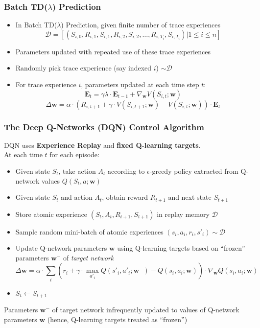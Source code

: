 \documentclass{beamer}
\begin{document}
\begin{frame}
\frametitle{Batch TD($\lambda$) Prediction}
\pause
\begin{itemize}[<+->]
\item In Batch TD($\lambda$) Prediction, given finite number of trace experiences
$$\mathcal{D} = [(S_{i,0}, R_{i,1}, S_{i,1}, R_{i,2}, S_{i,2}, \ldots, R_{i,T_i}, S_{i,T_i}) | 1 \leq i \leq n]$$
\item Parameters updated with repeated use of these trace experiences
\item Randomly pick trace experience (say indexed $i$) $\sim \mathcal{D}$
\item For trace experience $i$, parameters updated at each time step $t$:
$$\bm{E}_t = \gamma \lambda \cdot \bm{E}_{t-1} + \nabla_{\bm{w}} V(S_{i,t};\bm{w})$$
$$\Delta \bm{w} = \alpha \cdot (R_{i,t+1} + \gamma \cdot V(S_{i,t+1}; \bm{w}) - V(S_{i,t}; \bm{w})) \cdot \bm{E}_t$$
\end{itemize}
\end{frame}

\begin{frame}
\frametitle{The Deep Q-Networks (DQN) Control Algorithm}
\pause
DQN uses {\bf Experience Replay} and {\bf fixed Q-learning targets}.\\
\pause
At each time $t$ for each episode:
\begin{itemize}[<+->]
\item Given state $S_t$, take action $A_t$ according to $\epsilon$-greedy policy extracted from Q-network values $Q(S_t,a;\bm{w})$
\item Given state $S_t$ and action $A_t$, obtain reward $R_{t+1}$ and next state $S_{t+1}$
\item Store atomic experience $(S_t, A_t, R_{t+1}, S_{t+1})$ in replay memory $\mathcal{D}$
\item Sample random mini-batch  of atomic experiences $(s_i,a_i,r_i,s'_i) \sim \mathcal{D}$
\item Update Q-network parameters $\bm{w}$ using Q-learning targets based on ``frozen'' parameters $\bm{w}^-$ of {\em target network}
$$\Delta \bm{w} = \alpha \cdot \sum_i (r_i + \gamma \cdot \max_{a'_i} Q(s'_i, a'_i; \bm{w}^-) - Q(s_i,a_i;\bm{w})) \cdot \nabla_{\bm{w}} Q(s_i,a_i;\bm{w})$$ 
\item $S_t \leftarrow S_{t+1}$
\end{itemize}
\pause
Parameters $\bm{w}^-$ of target network infrequently updated to values of Q-network parameters $\bm{w}$ (hence, Q-learning targets treated as ``frozen'')
\end{frame}
\end{document}
